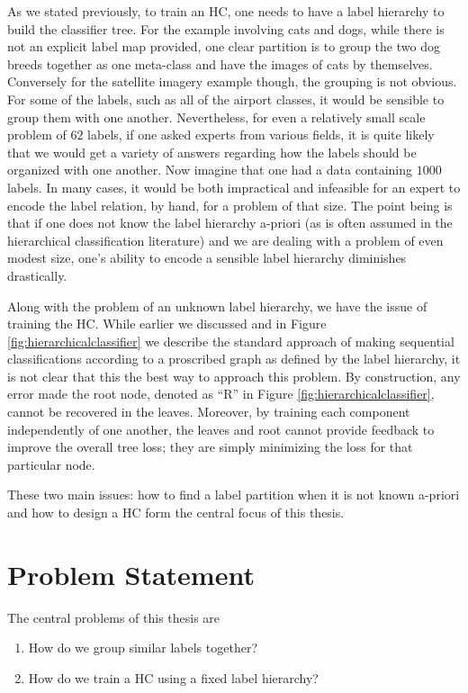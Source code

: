 \documentclass[draft, ../thesis.tex]{subfiles}
\begin{document}
    As we stated previously, to train an HC, one needs to have a label hierarchy to build the classifier tree. For the example involving cats and dogs, while there is not an explicit label map provided, one clear partition is to group the two dog breeds together as one meta-class and have the images of cats by themselves. Conversely for the satellite imagery example though, the grouping is not obvious. For some of the labels, such as all of the airport classes, it would be sensible to group them with one another. Nevertheless, for even a relatively small scale problem of $62$ labels, if one asked experts from various fields, it is quite likely that we would get a variety of answers regarding how the labels should be organized with one another. Now imagine that one had a data containing $1000$ labels. In many cases, it would be both impractical and infeasible for an expert to encode the label relation, by hand, for a problem of that size. The point being is that if one does not know the label hierarchy a-priori (as is often assumed in the hierarchical classification literature) and we are dealing with a problem of even modest size, one's ability to encode a sensible label hierarchy diminishes drastically.  
    
    Along with the problem of an unknown label hierarchy, we have the issue of training the HC. While earlier we discussed and in Figure \ref{fig:hierarchicalclassifier} we describe the standard approach of making sequential classifications according to a proscribed graph as defined by the label hierarchy, it is not clear that this the best way to approach this problem. By construction, any error made the root node, denoted as ``R'' in Figure \ref{fig:hierarchicalclassifier}, cannot be recovered in the leaves. Moreover, by training each component independently of one another, the leaves and root cannot provide feedback to improve the overall tree loss; they are simply minimizing the loss for that particular node. 
    
    These two main issues: how to find a label partition when it is not known a-priori and how to design a HC form the central focus of this thesis. 
    
    \section{Problem Statement}
    \label{problem_statement}
    The central problems of this thesis are
    
    \begin{enumerate}
    	\item How do we group similar labels together?
    	\item How do we train a HC using a fixed label hierarchy?
    \end{enumerate}
    
\end{document}
